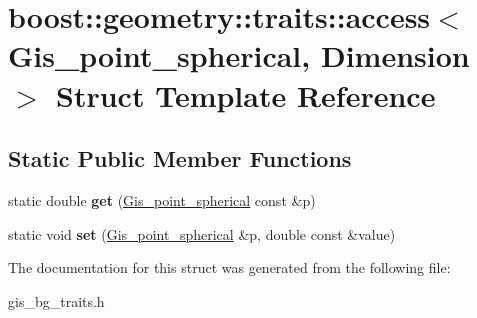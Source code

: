 \hypertarget{structboost_1_1geometry_1_1traits_1_1access_3_01Gis__point__spherical_00_01Dimension_01_4}{}\section{boost\+:\+:geometry\+:\+:traits\+:\+:access$<$ Gis\+\_\+point\+\_\+spherical, Dimension $>$ Struct Template Reference}
\label{structboost_1_1geometry_1_1traits_1_1access_3_01Gis__point__spherical_00_01Dimension_01_4}
\subsection*{Static Public Member Functions}
\begin{DoxyCompactItemize}
\item 
\mbox{\label{structboost_1_1geometry_1_1traits_1_1access_3_01Gis__point__spherical_00_01Dimension_01_4_adf39f60e3b1b45caebc52f19b1885508}} 
static double {\bfseries get} (\mbox{\hyperlink{classGis__point__spherical}{Gis\+\_\+point\+\_\+spherical}} const \&p)
\item 
\mbox{\label{structboost_1_1geometry_1_1traits_1_1access_3_01Gis__point__spherical_00_01Dimension_01_4_aa55a224132960c1594bc7069665ab4b8}} 
static void {\bfseries set} (\mbox{\hyperlink{classGis__point__spherical}{Gis\+\_\+point\+\_\+spherical}} \&p, double const \&value)
\end{DoxyCompactItemize}


The documentation for this struct was generated from the following file\+:\begin{DoxyCompactItemize}
\item 
gis\+\_\+bg\+\_\+traits.\+h\end{DoxyCompactItemize}
